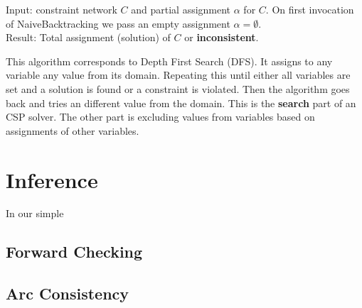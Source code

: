 Input: constraint network $C$ and partial assignment $\alpha$ for $C$. On first invocation of NaiveBacktracking we pass an empty assignment $\alpha = \emptyset$. \\
Result: Total assignment (solution) of $C$ or \textbf{inconsistent}.

This algorithm corresponds to Depth First Search (DFS). It assigns to any variable any value from its domain. Repeating this until either all variables are set and a solution is found or a constraint is violated. Then the algorithm goes back and tries an different value from the domain. This is the \textbf{search} part of an CSP solver. The other part is excluding values from variables based on assignments of other variables.

\section{Inference} \label{inference}

In our simple

\subsection{Forward Checking}

\subsection{Arc Consistency}


